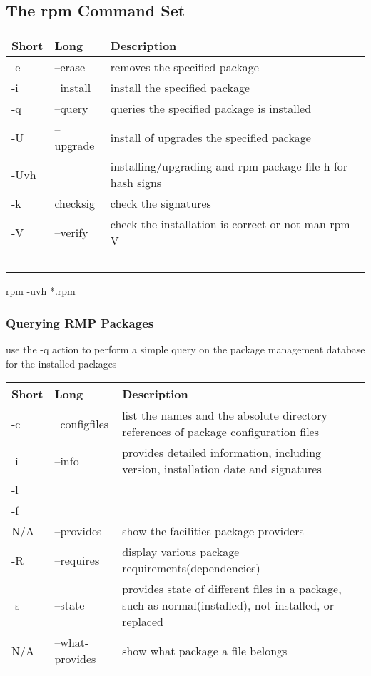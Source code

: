 \documentclass{book}
\begin{document}
	\subsection{The rpm Command Set}
	\begin{tabular}{lll}
		\hline
		Short & Long      & Description                                \\ \hline
		-e    & --erase   & removes the specified package              \\
		-i    & --install & install the specified package              \\
		-q    & --query   & queries the specified package is installed \\
		-U    & --upgrade & install of upgrades the specified package  \\
		-Uvh  &           & installing/upgrading and rpm package file h for hash signs\\
		-k & checksig & check the signatures\\
		-V & --verify & check the installation is correct or not man rpm -V \\
		- & & \\
	\end{tabular}
		rpm -uvh *.rpm
	\subsubsection{Querying RMP Packages}
		use the -q action to perform a simple query on the package management database for the installed packages
		\begin{tabular}{lll}
			\hline
			Short & Long            & Description                                                                                           \\ \hline
			-c    & --configfiles   & list the names and the absolute directory references of package configuration files                   \\
			-i    & --info          & provides detailed information, including version, installation date and signatures                    \\
			-l && \\
			-f && \\
			N/A   & --provides      & show the facilities package providers                                                                 \\
			-R    & --requires      & display various package requirements(dependencies)                                                    \\
			-s    & --state         & provides state of different files in a package, such as normal(installed), not installed, or replaced \\
			N/A   & --what-provides & show what package a file belongs
		\end{tabular}
\end{document}
